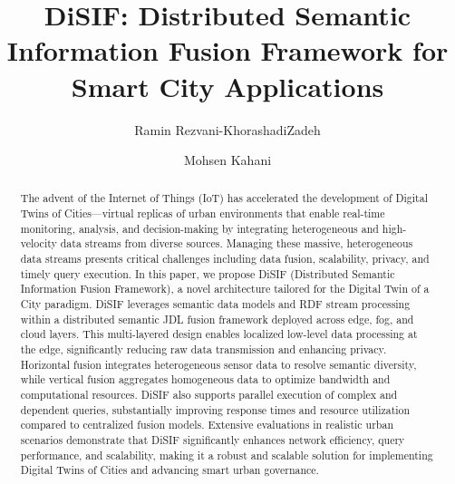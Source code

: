 \documentclass[5p,times]{elsarticle}
\begin{document}
\begin{frontmatter}
\title{DiSIF: Distributed Semantic Information Fusion Framework for Smart City Applications}
\author{Ramin Rezvani-KhorashadiZadeh}
\author{Mohsen Kahani}
\address{Department of Computer Engineering, Ferdowsi University of Mashhad, Mashhad, Iran }
\begin{abstract}
  The advent of the Internet of Things (IoT) has accelerated the development of Digital Twins of Cities—virtual replicas of urban
 environments that enable real-time monitoring, analysis, and decision-making by integrating heterogeneous and high-velocity data
 streams from diverse sources. Managing these massive, heterogeneous data streams presents critical challenges including data
 fusion, scalability, privacy, and timely query execution. In this paper, we propose DiSIF (Distributed Semantic Information Fusion
 Framework), a novel architecture tailored for the Digital Twin of a City paradigm. DiSIF leverages semantic data models and
 RDF stream processing within a distributed semantic JDL fusion framework deployed across edge, fog, and cloud layers. This
 multi-layered design enables localized low-level data processing at the edge, significantly reducing raw data transmission and
 enhancing privacy. Horizontal fusion integrates heterogeneous sensor data to resolve semantic diversity, while vertical fusion
 aggregates homogeneous data to optimize bandwidth and computational resources. DiSIF also supports parallel execution of
 complex and dependent queries, substantially improving response times and resource utilization compared to centralized fusion
 models. Extensive evaluations in realistic urban scenarios demonstrate that DiSIF significantly enhances network efficiency, query
 performance, and scalability, making it a robust and scalable solution for implementing Digital Twins of Cities and advancing smart
 urban governance.


\end{abstract}
\end{frontmatter}
\end{document}
